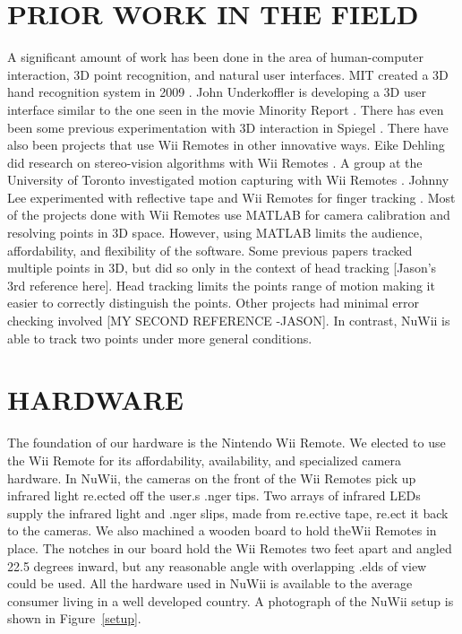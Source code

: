 \documentclass[a4paper,twoside]{article}
\begin{document}
\section{\uppercase{Prior Work in the Field}} \noindent  A significant amount
of work has been done in the area of human-computer interaction, 3D point
recognition, and natural user interfaces. MIT created a 3D hand recognition
system in 2009 \cite{Wang09}. John Underkoffler is developing a 3D user
interface similar to the one seen in the movie Minority Report
\cite{Underkoffler10}. There has even been some previous experimentation with
3D interaction in Spiegel \cite{Bak04}. There have also been projects that use
Wii Remotes in other innovative ways. Eike Dehling did research on
stereo-vision algorithms with Wii Remotes \cite{Dehling08}. A group at the
University of Toronto investigated motion capturing with Wii Remotes
\cite{Wang08}. Johnny Lee experimented with reflective tape and Wii Remotes for
finger tracking  \cite{Lee08}. Most of the projects done with Wii Remotes use
MATLAB for camera calibration and resolving points in 3D space. However, using
MATLAB limits the audience, affordability, and flexibility of the software.
Some previous papers tracked multiple points in 3D, but did so only in the
context of head tracking [Jason's 3rd reference here]. Head tracking limits the
points range of motion making it easier to correctly distinguish the points.
Other projects had minimal error checking involved [MY SECOND REFERENCE
-JASON]. In contrast, NuWii is able to track two points under more general
conditions.
 
\section{\uppercase{Hardware}} \noindent The foundation of our hardware is the
Nintendo Wii Remote. We elected to use the Wii Remote for its affordability,
availability, and specialized camera hardware. In NuWii, the cameras on the
front of the Wii Remotes pick up infrared light re.ected off the user.s .nger
tips. Two arrays of infrared LEDs supply the infrared light and .nger slips,
made from re.ective tape, re.ect it back to the cameras. We also machined a
wooden board to hold theWii Remotes in place. The notches in our board hold the
Wii Remotes two feet apart and angled 22.5 degrees inward, but any reasonable
angle with overlapping .elds of view could be used. All the hardware used in
NuWii is available to the average consumer living in a well developed country.
A photograph of the NuWii setup is shown in Figure~\ref{setup}. 
\end{document}
